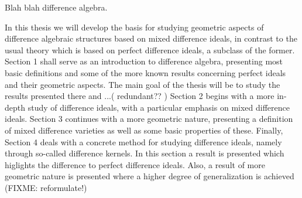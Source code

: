 Blah blah difference algebra. 

In this thesis we will develop the basis for studying geometric aspects of difference algebraic structures based on mixed difference ideals, in contrast to the usual theory which is based on perfect difference ideals, a subclass of the former. Section 1 shall serve as an introduction to difference algebra, presenting most basic definitions and some of the more known results concerning perfect ideals and their geometric aspects.
The main goal of the thesis will be to study the results presented there and ...( redundant?? )
Section 2 begins with a more in-depth study of difference ideals, with a particular emphasis on mixed difference ideals.
Section 3 continues with a more geometric nature, presenting a definition of mixed difference varieties as well as some basic properties of these. 
Finally, Section 4 deals with a concrete method for studying difference ideals, namely through so-called difference kernels. In this section a result is presented which higlights the difference to perfect difference ideals.
Also, a result of more geometric nature is presented where a higher degree of generalization is achieved (FIXME: reformulate!)
